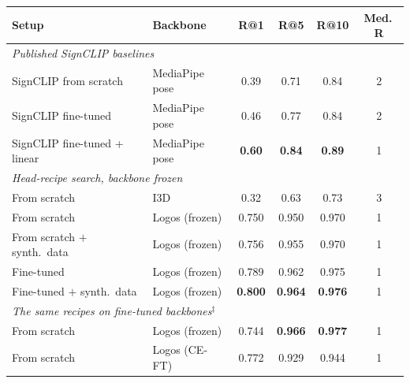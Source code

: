\begin{table}[t]
\centering
\footnotesize
\setlength{\tabcolsep}{3pt}
\begin{tabular}{llcccc}
\toprule
\textbf{Setup} & \textbf{Backbone} & \textbf{R@1} & \textbf{R@5} & \textbf{R@10} & \textbf{Med.\,R} \\
\midrule
\multicolumn{6}{l}{\textit{Published SignCLIP baselines}} \\
SignCLIP from scratch        & MediaPipe pose & 0.39 & 0.71 & 0.84 & 2 \\
SignCLIP fine-tuned          & MediaPipe pose & 0.46 & 0.77 & 0.84 & 2 \\
SignCLIP fine-tuned + linear & MediaPipe pose & \textbf{0.60} & \textbf{0.84} & \textbf{0.89} & 1 \\
\midrule
\multicolumn{6}{l}{\textit{Head-recipe search, backbone frozen}} \\
From scratch          & I3D                  & 0.32  & 0.63  & 0.73  & 3 \\
From scratch          & Logos (frozen) & 0.750 & 0.950 & 0.970 & 1 \\
From scratch $+$ synth.\ data & Logos (frozen) & 0.756 & 0.955 & 0.970 & 1 \\
Fine-tuned            & Logos (frozen) & 0.789 & 0.962 & 0.975 & 1 \\
Fine-tuned $+$ synth.\ data & Logos (frozen) & \textbf{0.800} & \textbf{0.964} & \textbf{0.976} & 1 \\
\midrule
\multicolumn{6}{l}{\textit{The same recipes on fine-tuned backbones}$^{\ddagger}$} \\
From scratch              & Logos (frozen)   & 0.744 & \textbf{0.966} & \textbf{0.977} & 1 \\
From scratch              & Logos (CE-FT)    & 0.772 & 0.929 & 0.944 & 1 \\

\end{tabular}
\end{table}
